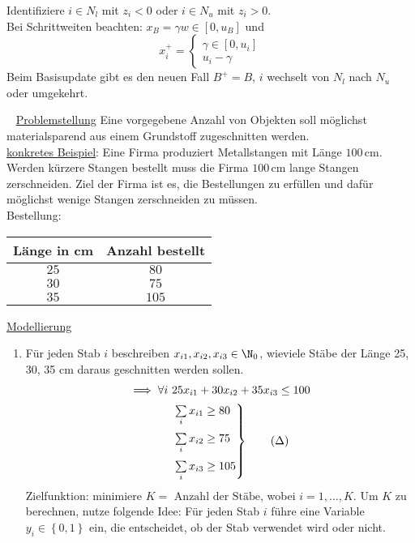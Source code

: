 Identifiziere $i \in N_{l}$ mit $z_{i} <0 $ oder $ i\in N_{u}$ mit $z_{i}> 0$.\\
Bei Schrittweiten beachten: $x_{B} = \gamma w \in [0,u_{B}]$ und
\begin{equation*}
	x_{i}^+ = \begin{cases}
	 \gamma \in [0,u_{i}]\\
	 u_{i}-\gamma
\end{cases}
\end{equation*}
Beim Basisupdate gibt es den neuen Fall $B^+ = B$, $i$ wechselt von $N_{l}$ nach $N_{u}$ oder umgekehrt.
\begin{beispiel}[Zuschnittsoptimierung]~\nl
  	\underline{Problemstellung} Eine vorgegebene Anzahl von Objekten soll möglichst materialsparend aus einem Grundstoff zugeschnitten werden.\\
  	\underline{konkretes Beispiel}: Eine Firma produziert Metallstangen mit Länge $100\,$cm. Werden kürzere Stangen bestellt muss die Firma $100\,$cm lange Stangen zerschneiden. Ziel der Firma ist es, die Bestellungen zu erfüllen und dafür möglichst wenige Stangen zerschneiden zu müssen.\\
  	Bestellung:
	\begin{table}[H]
		\centering
		\begin{tabular}{c|c}
			Länge in cm & Anzahl bestellt\\
      		\hline
      		$25$ & $80$ \\
      		$30$ & $75$ \\
      		$35$ & $105$ \\
  		\end{tabular}
	\end{table}
	\underline{Modellierung}
  \begin{enumerate}[label={Variante \arabic*.}]
    \item \label{item:Zuschnittsillymodel} Für jeden Stab $i$ beschreiben $x_{i1},x_{i2},x_{i3} \in \N_{0}$, wieviele Stäbe der Länge 25, 30, 35 cm daraus geschnitten werden sollen.
      \begin{align}
        \implies \forall i~ & 25x_{i1} + 30x_{i2} + 35x_{i3}\leq 100 \notag\\
                            &
        \begin{rcases}
          \sum\limits_{i}^{} x_{i1} \geq 80\\
          \sum\limits_{i}^{} x_{i2} \geq 75\\
          \sum\limits_{i}^{} x_{i3} \geq 105
        \end{rcases} \tag{$\Delta$}\label{model_cutting_1}
      \end{align}
      Zielfunktion: minimiere $K = \text{ Anzahl der Stäbe}$, wobei $i = 1,\dots ,K$.
      Um $K$ zu berechnen, nutze folgende Idee: Für jeden Stab $i$ führe eine Variable $y_{i} \in \left\{0,1 \right\}$ ein, die entscheidet, ob der Stab verwendet wird oder nicht.


\end{enumerate}
\end{beispiel}
